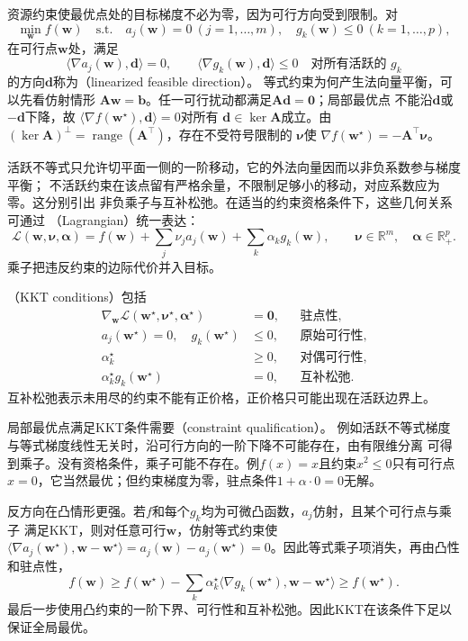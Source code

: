 资源约束使最优点处的目标梯度不必为零，因为可行方向受到限制。对
\[
  \min_{\bm{w}}f(\bm{w})
  \quad\text{s.t.}\quad
  a_j(\bm{w})=0\ (j=1,\ldots,m),\quad
  g_k(\bm{w})\leq0\ (k=1,\ldots,p),
\]
在可行点$\bm{w}$处，满足
\[
  \langle\nabla a_j(\bm{w}),\bm{d}\rangle=0,\qquad
  \langle\nabla g_k(\bm{w}),\bm{d}\rangle\leq0
  \quad\text{对所有活跃的 }g_k
\]
的方向$\bm{d}$称为（linearized feasible direction）。
等式约束为何产生法向量平衡，可以先看仿射情形
$\bm{A}\bm{w}=\bm{b}$。任一可行扰动都满足$\bm{A}\bm{d}=\bm{0}$；局部最优点
不能沿$\bm{d}$或$-\bm{d}$下降，故
$\langle\nabla f(\bm{w}^{\star}),\bm{d}\rangle=0$对所有
$\bm{d}\in\ker\bm{A}$成立。由
$(\ker\bm{A})^\perp=\operatorname{range}(\bm{A}^{\top})$，存在不受符号限制的
$\bm{\nu}$使
$\nabla f(\bm{w}^{\star})=-\bm{A}^{\top}\bm{\nu}$。

活跃不等式只允许切平面一侧的一阶移动，它的外法向量因而以非负系数参与梯度平衡；
不活跃约束在该点留有严格余量，不限制足够小的移动，对应系数应为零。这分别引出
非负乘子与互补松弛。在适当的约束资格条件下，这些几何关系可通过
（Lagrangian）统一表达：
\[
  \mathcal{L}(\bm{w},\bm{\nu},\bm{\alpha})
  =f(\bm{w})+\sum_j\nu_j a_j(\bm{w})
  +\sum_k\alpha_k g_k(\bm{w}),
  \qquad
  \bm{\nu}\in\mathbb{R}^m,\quad
  \bm{\alpha}\in\mathbb{R}_+^p.
\]
乘子把违反约束的边际代价并入目标。

（KKT conditions）包括
\begin{align}
  \nabla_{\bm{w}}\mathcal{L}(\bm{w}^{\star},\bm{\nu}^{\star},
  \bm{\alpha}^{\star})&=\bm{0},
  &&\text{驻点性},\label{eq:opt-kkt-stationarity}\\
  a_j(\bm{w}^{\star})=0,\quad g_k(\bm{w}^{\star})&\leq0,
  &&\text{原始可行性},\\
  \alpha_k^{\star}&\geq0,
  &&\text{对偶可行性},\\
  \alpha_k^{\star}g_k(\bm{w}^{\star})&=0,
  &&\text{互补松弛}.\label{eq:opt-kkt-complementarity}
\end{align}
互补松弛表示未用尽的约束不能有正价格，正价格只可能出现在活跃边界上。

局部最优点满足KKT条件需要（constraint qualification）。
例如活跃不等式梯度与等式梯度线性无关时，沿可行方向的一阶下降不可能存在，由有限维分离
可得到乘子。没有资格条件，乘子可能不存在。例$f(x)=x$且约束$x^2\leq0$只有可行点
$x=0$，它当然最优；但约束梯度为零，驻点条件$1+\alpha\cdot0=0$无解。

反方向在凸情形更强。若$f$和每个$g_k$均为可微凸函数，$a_j$仿射，且某个可行点与乘子
满足KKT，则对任意可行$\bm{w}$，仿射等式约束使
$\langle\nabla a_j(\bm{w}^{\star}),\bm{w}-\bm{w}^{\star}\rangle
=a_j(\bm{w})-a_j(\bm{w}^{\star})=0$。因此等式乘子项消失，再由凸性和驻点性，
\[
  f(\bm{w})\geq
  f(\bm{w}^{\star})
  -\sum_k\alpha_k^{\star}
  \langle\nabla g_k(\bm{w}^{\star}),\bm{w}-\bm{w}^{\star}\rangle
  \geq f(\bm{w}^{\star}).
\]
最后一步使用凸约束的一阶下界、可行性和互补松弛。因此KKT在该条件下足以保证全局最优。

